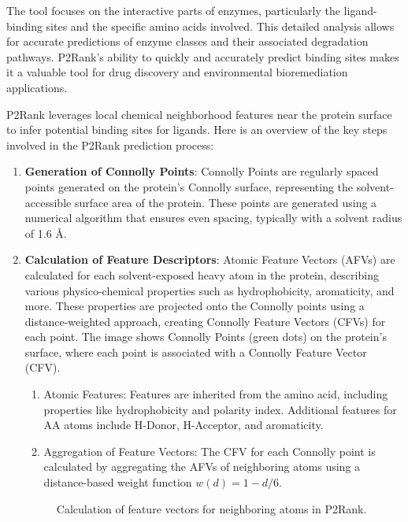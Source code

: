 The tool focuses on the interactive parts of enzymes, particularly the ligand-binding sites and the specific amino acids involved. This detailed analysis allows for accurate predictions of enzyme classes and their associated degradation pathways. P2Rank's ability to quickly and accurately predict binding sites makes it a valuable tool for drug discovery and environmental bioremediation applications.

P2Rank leverages local chemical neighborhood features near the protein surface to infer potential binding sites for ligands. Here is an overview of the key steps involved in the P2Rank prediction process:

\begin{enumerate} 
    \item \textbf{Generation of Connolly Points}: Connolly Points are regularly spaced points generated on the protein’s Connolly surface, representing the solvent-accessible surface area of the protein. These points are generated using a numerical algorithm that ensures even spacing, typically with a solvent radius of 1.6 Å.
    \item \textbf{Calculation of Feature Descriptors}: Atomic Feature Vectors (AFVs) are calculated for each solvent-exposed heavy atom in the protein, describing various physico-chemical properties such as hydrophobicity, aromaticity, and more. These properties are projected onto the Connolly points using a distance-weighted approach, creating Connolly Feature Vectors (CFVs) for each point. The image shows Connolly Points (green dots) on the protein’s surface, where each point is associated with a Connolly Feature Vector (CFV).
    \begin{enumerate}
        \item Atomic Features: Features are inherited from the amino acid, including properties like hydrophobicity and polarity index. Additional features for AA atoms include H-Donor, H-Acceptor, and aromaticity.
        \item Aggregation of Feature Vectors: The CFV for each Connolly point is calculated by aggregating the AFVs of neighboring atoms using a distance-based weight function $w(d) = 1 - d / 6$.
    \end{enumerate}
        \begin{figure}[hbt]
            \centering
            \begin{minipage}[t]{.9\textwidth}
            \caption{Calculation of feature vectors for neighboring atoms in P2Rank.}

\end{minipage}
\end{figure}
\end{enumerate}
